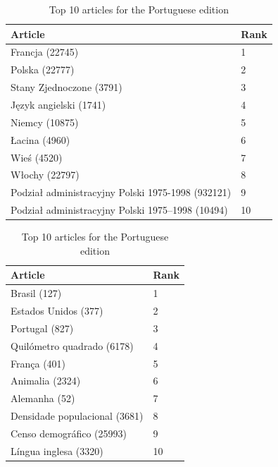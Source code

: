 \begin{table}[htbp]
    \begin{minipage}{.60\linewidth}
        \centering
        \begin{tabular}{ll}
            \toprule
            Article & Rank\\
            \midrule
            Francja (22745) & 1\\
            Polska (22777) & 2\\
            Stany Zjednoczone (3791) & 3\\
            Język angielski (1741) & 4\\
            Niemcy (10875) & 5\\
            Łacina (4960) & 6\\
            Wieś (4520) & 7\\
            Włochy (22797) & 8\\
            Podział administracyjny Polski 1975-1998 (932121) & 9\\
            Podział administracyjny Polski 1975–1998 (10494) & 10\\
            \bottomrule
        \end{tabular}
        \caption{Top 10 articles for the Polish edition}
    \end{minipage}
    \hfill
    \begin{minipage}{.30\linewidth}
        \centering
        \begin{tabular}{ll}
            \toprule
            Article & Rank\\
            \midrule
            Brasil (127) & 1\\
            Estados Unidos (377) & 2\\
            Portugal (827) & 3\\
            Quilómetro quadrado (6178) & 4\\
            França (401) & 5\\
            Animalia (2324) & 6\\
            Alemanha (52) & 7\\
            Densidade populacional (3681) & 8\\
            Censo demográfico (25993) & 9\\
            Língua inglesa (3320) & 10\\
            \bottomrule
        \end{tabular}
        \caption{Top 10 articles for the Portuguese edition}
    \end{minipage}
\end{table}
